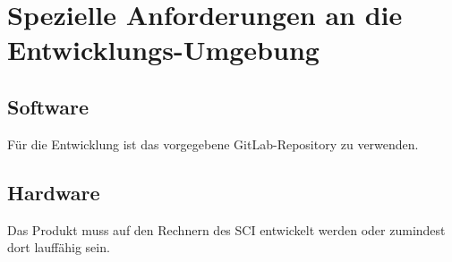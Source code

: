 \chapter{Spezielle Anforderungen an die Entwicklungs-Umgebung}

	\section{Software}

		Für die Entwicklung ist das vorgegebene GitLab-Repository zu verwenden.


	\section{Hardware}

		Das Produkt muss auf den Rechnern des SCI entwickelt werden oder zumindest dort lauffähig sein.
